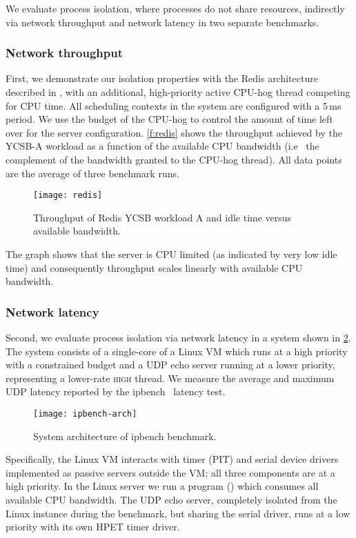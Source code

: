 We evaluate process isolation, where processes do not share resources, indirectly via network
throughput and network latency in two separate benchmarks. 
\subsubsection{Network throughput}

First, we demonstrate our isolation properties with the Redis architecture described in
, with an additional, high-priority active CPU-hog thread
competing for \gls{CPU} time.  All scheduling contexts in the system are configured with a
5\,ms period. We use the budget of the CPU-hog to control the amount of time left over
for the server configuration. \autoref{f:redis} shows the throughput
achieved by the YCSB-A workload as a function of the available CPU
bandwidth (i.e \ the complement of the bandwidth granted to the CPU-hog
thread). All data points are the average of three benchmark runs.

\begin{figure}[h]
  \centering
  \texttt{[image: redis]}
  \caption[Results of Redis isolation benchmark.]{Throughput of Redis YCSB workload A and idle time versus available bandwidth.}
  \label{f:redis}
\end{figure}

The graph shows that the server is CPU limited (as indicated by very low idle time)
and consequently throughput scales linearly with available CPU
bandwidth.

\subsubsection{Network latency}

Second, we evaluate process isolation via network latency in a system shown in \cref{f:ipbench-arch}. 
The system consists of a single-core of a Linux \gls{VM} which runs at a high priority with a
constrained budget and a \gls{UDP} echo server running at a lower priority,
representing a lower-rate \textsc{high} thread. We
measure the average  and maximum UDP latency reported by the
ipbench~\citep{Wienand_Macpherson_04} latency test.

\begin{figure}[h]
    \centering
    \texttt{[image: ipbench-arch]}
    \caption{System architecture of ipbench benchmark.}
    \label{f:ipbench-arch}
\end{figure}


Specifically, the Linux VM interacts with timer (PIT) and serial device drivers implemented as
passive servers outside the \gls{VM}; all three components are at a high priority. In the Linux server we
run a program () which consumes all available
CPU bandwidth.  The UDP echo server, completely isolated from the Linux instance during the
benchmark, but sharing the
serial driver, runs at a low priority with its own HPET timer
driver.

